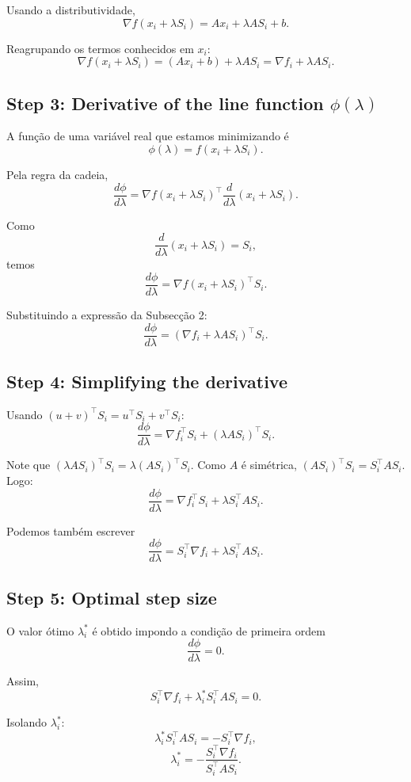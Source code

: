 \documentclass[9pt,a4paper]{extarticle}
\begin{document}
Usando a distributividade,
\[
\nabla f(x_i + \lambda S_i)
= A x_i + \lambda A S_i + b.
\]

Reagrupando os termos conhecidos em $x_i$:
\[
\nabla f(x_i + \lambda S_i)
= (A x_i + b) + \lambda A S_i
= \nabla f_i + \lambda A S_i.
\]

\subsection*{Step 3: Derivative of the line function \texorpdfstring{$\phi(\lambda)$}{phi(lambda)}}

A função de uma variável real que estamos minimizando é
\[
\phi(\lambda) = f(x_i + \lambda S_i).
\]

Pela regra da cadeia,
\[
\frac{d\phi}{d\lambda}
= \nabla f(x_i + \lambda S_i)^\top \frac{d}{d\lambda}(x_i + \lambda S_i).
\]

Como
\[
\frac{d}{d\lambda}(x_i + \lambda S_i) = S_i,
\]
temos
\[
\frac{d\phi}{d\lambda}
= \nabla f(x_i + \lambda S_i)^\top S_i.
\]

Substituindo a expressão da Subsecção 2:
\[
\frac{d\phi}{d\lambda}
= (\nabla f_i + \lambda A S_i)^\top S_i.
\]

\subsection*{Step 4: Simplifying the derivative}

Usando $(u+v)^\top S_i = u^\top S_i + v^\top S_i$:
\[
\frac{d\phi}{d\lambda}
= \nabla f_i^\top S_i + (\lambda A S_i)^\top S_i.
\]

Note que $(\lambda A S_i)^\top S_i = \lambda (A S_i)^\top S_i$.  
Como $A$ é simétrica, $(A S_i)^\top S_i = S_i^\top A S_i$. Logo:
\[
\frac{d\phi}{d\lambda}
= \nabla f_i^\top S_i + \lambda S_i^\top A S_i.
\]

Podemos também escrever
\[
\frac{d\phi}{d\lambda}
= S_i^\top \nabla f_i + \lambda S_i^\top A S_i.
\]

\subsection*{Step 5: Optimal step size}

O valor ótimo $\lambda_i^*$ é obtido impondo a condição de primeira ordem
\[
\frac{d\phi}{d\lambda} = 0.
\]

Assim,
\[
S_i^\top \nabla f_i + \lambda_i^* S_i^\top A S_i = 0.
\]

Isolando $\lambda_i^*$:
\[
\lambda_i^* S_i^\top A S_i = - S_i^\top \nabla f_i,
\]
\[
\lambda_i^* = -\frac{S_i^\top \nabla f_i}{S_i^\top A S_i}.
\]
\end{document}
